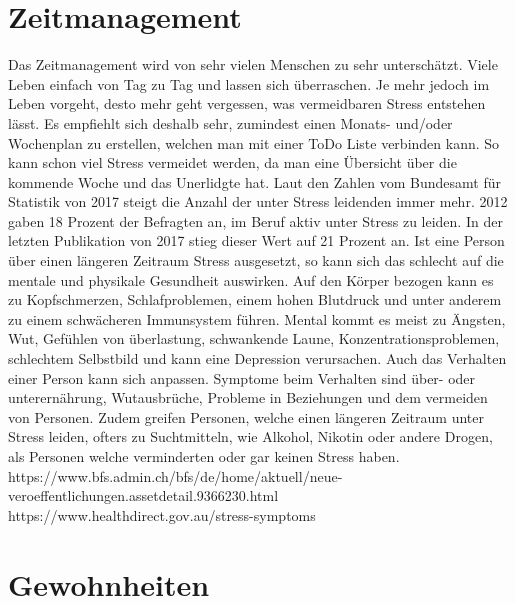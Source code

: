 \section{Zeitmanagement}
Das Zeitmanagement wird von sehr vielen Menschen zu sehr unterschätzt. Viele Leben einfach von Tag zu Tag und lassen sich überraschen. Je mehr jedoch im Leben vorgeht, desto mehr geht vergessen, was vermeidbaren Stress entstehen lässt. 
\newline
Es empfiehlt sich deshalb sehr, zumindest einen Monats- und/oder Wochenplan zu erstellen, welchen man mit einer ToDo Liste verbinden kann. So kann schon viel Stress vermeidet werden, da man eine Übersicht über die kommende Woche und das Unerlidgte hat. 
\newline
Laut den Zahlen vom Bundesamt für Statistik von 2017 steigt die Anzahl der unter Stress leidenden immer mehr. 2012 gaben 18 Prozent der Befragten an, im Beruf aktiv unter Stress zu leiden. In der letzten Publikation von 2017 stieg dieser Wert auf 21 Prozent an. Ist eine Person über einen längeren Zeitraum Stress ausgesetzt, so kann sich das schlecht auf die mentale und physikale Gesundheit auswirken. Auf den Körper bezogen kann es zu Kopfschmerzen, Schlafproblemen, einem hohen Blutdruck und unter anderem zu einem schwächeren Immunsystem führen. Mental kommt es meist zu Ängsten, Wut, Gefühlen von überlastung, schwankende Laune, Konzentrationsproblemen, schlechtem Selbstbild und kann eine Depression verursachen. Auch das Verhalten einer Person kann sich anpassen. Symptome beim Verhalten sind über- oder unterernährung, Wutausbrüche, Probleme in Beziehungen und dem vermeiden von Personen. Zudem greifen Personen, welche einen längeren Zeitraum unter Stress leiden, ofters zu Suchtmitteln, wie Alkohol, Nikotin oder andere Drogen, als Personen welche verminderten oder gar keinen Stress haben.
\newline
https://www.bfs.admin.ch/bfs/de/home/aktuell/neue-veroeffentlichungen.assetdetail.9366230.html
\newline
https://www.healthdirect.gov.au/stress-symptoms
\section{Gewohnheiten}
\lipsum[4-8][32-64]
